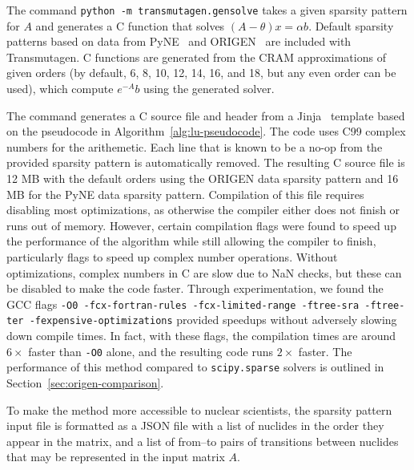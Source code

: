 The command \texttt{python -m transmutagen.gensolve} takes a given sparsity
pattern for $A$ and generates a C function that solves $(A - \theta)x =\alpha
b$. Default sparsity patterns based on data from PyNE~\cite{ationneeded} and
ORIGEN~\cite{ationneeded} are included with Transmutagen. C functions are
generated from the CRAM approximations of given orders (by default, 6, 8, 10,
12, 14, 16, and 18, but any even order can be used), which compute $e^{-A}b$
using the generated solver.

The command generates a C source file and header from a
Jinja~\cite{ationneeded} template based on the pseudocode in
Algorithm~\ref{alg:lu-pseudocode}. The code uses C99 complex numbers for the
arithemetic. Each line that is known to be a no-op from the provided sparsity
pattern is automatically removed. The resulting C source file is 12 MB with
the default orders using the ORIGEN data sparsity pattern and 16 MB for the
PyNE data sparsity pattern. Compilation of this file requires disabling most
optimizations, as otherwise the compiler either does not finish or runs out of
memory. However, certain compilation flags were found to speed up the
performance of the algorithm while still allowing the compiler to finish,
particularly flags to speed up complex number operations. Without
optimizations, complex numbers in C are slow due to NaN checks, but these can
be disabled to make the code faster.  Through experimentation, we found the GCC flags \texttt{-O0
-fcx-fortran-rules -fcx-limited-range -ftree-sra -ftree-ter
-fexpensive-optimizations} provided speedups without adversely slowing down
compile times. In fact, with these flags, the compilation times are around
$6\times$ faster than \texttt{-O0} alone, and the resulting code runs
$2\times$ faster. The performance of this method compared to
\texttt{scipy.\allowbreak{}sparse} solvers is outlined in
Section~\ref{sec:origen-comparison}.

To make the method more accessible to nuclear scientists, the sparsity pattern
input file is formatted as a JSON file with a list of nuclides in the order
they appear in the matrix, and a list of from--to pairs of transitions between
nuclides that may be represented in the input matrix $A$.

